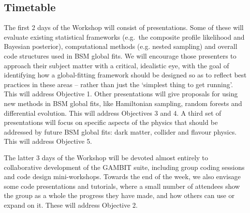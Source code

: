 \documentclass[a4paper,11pt]{article}
\begin{document}
\subsection*{Timetable}

The first 2 days of the Workshop will consist of presentations.  Some of these will evaluate existing statistical frameworks (e.g.\ the composite profile likelihood and Bayesian posterior), computational methods (e.g. nested sampling) and overall code structures used in BSM global fits.  We will encourage those presenters to approach their subject matter with a critical, idealistic eye, with the goal of identifying how a global-fitting framework should be designed so as to reflect best practices in these areas -- rather than just the `simplest thing to get running'.  This will address Objective 1.  Other presentations will give proposals for using new methods in BSM global fits, like Hamiltonian sampling, random forests and differential evolution.  This will address Objectives 3 and 4.  A third set of presentations will focus on specific aspects of the physics that should be addressed by future BSM global fits: dark matter, collider and flavour physics.  This will address Objective 5.

The latter 3 days of the Workshop will be devoted almost entirely to collaborative development of the GAMBIT suite, including group coding sessions and code design mini-workshops.  Towards the end of the week, we also envisage some code presentations and tutorials, where a small number of attendees show the group as a whole the progress they have made, and how others can use or expand on it.  These will address Objective 2.
\end{document}
